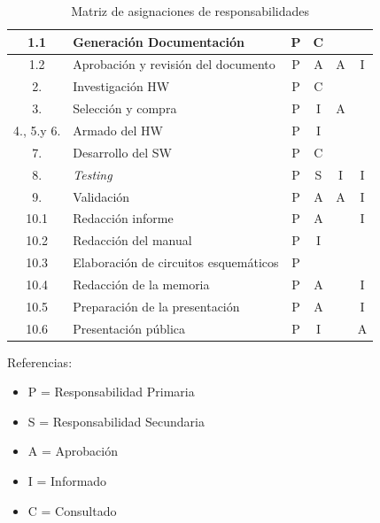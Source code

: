 \documentclass[11pt]{charter}
\begin{document}
\begin{table}[htbp]
\begin{tabularx}{\textwidth}{@{}|c|p{11em}|p{5.8em}|p{4.8em}|p{6em}|X|@{}}
\hline \rowcolor[gray]{.8}
1.1 & Generación Documentación & \multicolumn{1}{c|}{P} & \multicolumn{1}{c|}{C} & &  \\
\hline 
1.2 & Aprobación y revisión del documento &\multicolumn{1}{c|}{P} &\multicolumn{1}{c|}{A}& \multicolumn{1}{c|}{A} &\multicolumn{1}{c|}{I} \\
\hline \rowcolor[gray]{.8}
2. & Investigación HW &\multicolumn{1}{c|}{P} & \multicolumn{1}{c|}{C} &   &  \\
\hline
3. & Selección y compra &\multicolumn{1}{c|}{P} &\multicolumn{1}{c|}{I} &\multicolumn{1}{c|}{A} &  \\
\hline \rowcolor[gray]{.8}
4., 5.y 6. & Armado del HW &\multicolumn{1}{c|}{P} &\multicolumn{1}{c|}{I}  &   &  \\
\hline
7. & Desarrollo del SW &\multicolumn{1}{c|}{P} &\multicolumn{1}{c|}{C} & & \\
\hline \rowcolor[gray]{.8}
8. & \textit{Testing} &\multicolumn{1}{c|}{P} &\multicolumn{1}{c|}{S} &\multicolumn{1}{c|}{I} &\multicolumn{1}{c|}{I}\\
\hline
9. &  Validación &\multicolumn{1}{c|}{P} &\multicolumn{1}{c|}{A} &\multicolumn{1}{c|}{A} &\multicolumn{1}{c|}{I} \\
\hline \rowcolor[gray]{.8}
10.1 & Redacción informe &\multicolumn{1}{c|}{P} &\multicolumn{1}{c|}{A} &  &\multicolumn{1}{c|}{I} \\
\hline
10.2 & Redacción del manual &\multicolumn{1}{c|}{P} &\multicolumn{1}{c|}{I} &   &  \\
\hline \rowcolor[gray]{.8}
10.3 & Elaboración de circuitos esquemáticos &\multicolumn{1}{c|}{P} &   &   & \\
\hline
10.4 & Redacción de la memoria &\multicolumn{1}{c|}{P}  &\multicolumn{1}{c|}{A} &   &\multicolumn{1}{c|}{I} \\
\hline \rowcolor[gray]{.8}
10.5 & Preparación de la presentación &\multicolumn{1}{c|}{P}  &\multicolumn{1}{c|}{A} &  &\multicolumn{1}{c|}{I} \\
\hline
10.6 & Presentación pública &\multicolumn{1}{c|}{P} &\multicolumn{1}{c|}{I} &  & \multicolumn{1}{c|}{A} \\
\hline 
\end{tabularx}%
\caption{Matriz de asignaciones de responsabilidades}
\label{tab:addlabel}
\end{table}

{\footnotesize
Referencias:
\begin{itemize}
	\item P = Responsabilidad Primaria
	\item S = Responsabilidad Secundaria
	\item A = Aprobación
	\item I = Informado
	\item C = Consultado
\end{itemize}
} %
\end{document}
